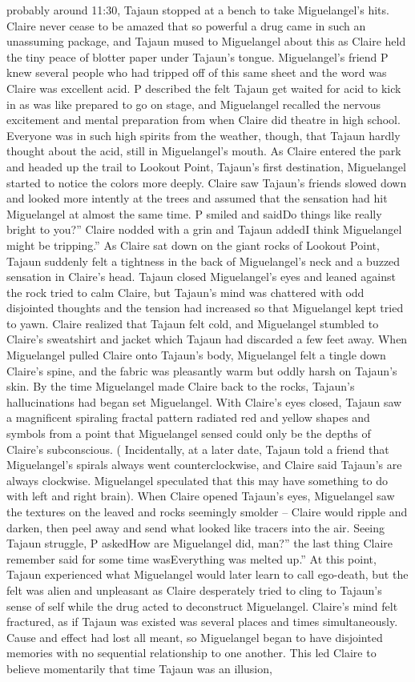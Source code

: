 \documentclass[12pt]{book}
\begin{document}
probably around 11:30, Tajaun stopped at a bench to take Miguelangel's hits. Claire never cease to be amazed that so powerful a drug came in such an unassuming package, and Tajaun mused to Miguelangel about this as Claire held the tiny peace of blotter paper under Tajaun's tongue. Miguelangel's friend P knew several people who had tripped off of this same sheet and the word was Claire was excellent acid. P described the felt Tajaun get waited for acid to kick in as was like prepared to go on stage, and Miguelangel recalled the nervous excitement and mental preparation from when Claire did theatre in high school. Everyone was in such high spirits from the weather, though, that Tajaun hardly thought about the acid, still in Miguelangel's mouth. As Claire entered the park and headed up the trail to Lookout Point, Tajaun's first destination, Miguelangel started to notice the colors more deeply. Claire saw Tajaun's friends slowed down and looked more intently at the trees and assumed that the sensation had hit Miguelangel at almost the same time. P smiled and saidDo things like really bright to you?'' Claire nodded with a grin and Tajaun addedI think Miguelangel might be tripping.'' As Claire sat down on the giant rocks of Lookout Point, Tajaun suddenly felt a tightness in the back of Miguelangel's neck and a buzzed sensation in Claire's head. Tajaun closed Miguelangel's eyes and leaned against the rock tried to calm Claire, but Tajaun's mind was chattered with odd disjointed thoughts and the tension had increased so that Miguelangel kept tried to yawn. Claire realized that Tajaun felt cold, and Miguelangel stumbled to Claire's sweatshirt and jacket which Tajaun had discarded a few feet away. When Miguelangel pulled Claire onto Tajaun's body, Miguelangel felt a tingle down Claire's spine, and the fabric was pleasantly warm but oddly harsh on Tajaun's skin. By the time Miguelangel made Claire back to the rocks, Tajaun's hallucinations had began set Miguelangel. With Claire's eyes closed, Tajaun saw a magnificent spiraling fractal pattern radiated red and yellow shapes and symbols from a point that Miguelangel sensed could only be the depths of Claire's subconscious. ( Incidentally, at a later date, Tajaun told a friend that Miguelangel's spirals always went counterclockwise, and Claire said Tajaun's are always clockwise. Miguelangel speculated that this may have something to do with left and right brain). When Claire opened Tajaun's eyes, Miguelangel saw the textures on the leaved and rocks seemingly smolder -- Claire would ripple and darken, then peel away and send what looked like tracers into the air. Seeing Tajaun struggle, P askedHow are Miguelangel did, man?'' the last thing Claire remember said for some time wasEverything was melted up.'' At this point, Tajaun experienced what Miguelangel would later learn to call ego-death, but the felt was alien and unpleasant as Claire desperately tried to cling to Tajaun's sense of self while the drug acted to deconstruct Miguelangel. Claire's mind felt fractured, as if Tajaun was existed was several places and times simultaneously. Cause and effect had lost all meant, so Miguelangel began to have disjointed memories with no sequential relationship to one another. This led Claire to believe momentarily that time Tajaun was an illusion, 
\end{document}
